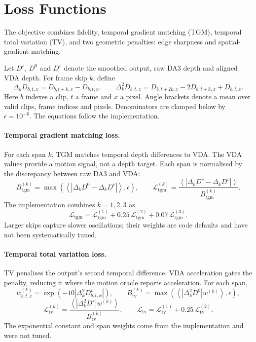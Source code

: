 \section{Loss Functions}
\label{sec:smoother-losses}

The objective combines fidelity, temporal gradient matching (TGM), temporal total variation (TV),
and two geometric penalties: edge sharpness and spatial-gradient matching. 

Let $D^s$, $D^0$ and $D^v$ denote the smoothed output, raw DA3 depth and aligned VDA depth. For
frame skip $k$, define
\[
    \Delta_k D_{b,t,x}=D_{b,t+k,x}-D_{b,t,x},\qquad
    \Delta_k^2D_{b,t,x}=D_{b,t+2k,x}-2D_{b,t+k,x}+D_{b,t,x}.
\]
Here $b$ indexes a clip, $t$ a frame and $x$ a pixel. Angle brackets denote a mean over valid
clips, frame indices and pixels. Denominators are clamped below by $\epsilon=10^{-6}$. The equations follow the implementation.

\paragraph{Temporal gradient matching loss.}
\label{sec:smoother-tgm}

For each span $k$, TGM matches temporal depth differences to VDA. The VDA values provide a motion
signal, not a depth target. Each span is normalised by the discrepancy between raw DA3 and VDA:
\[
    B_{\mathrm{tgm}}^{(k)}
      =\max\!\left(\left\langle\left|\Delta_kD^0-\Delta_kD^v\right|\right\rangle,\epsilon\right),
    \qquad
    \mathcal{L}_{\mathrm{tgm}}^{(k)}
      =\frac{\left\langle\left|\Delta_kD^s-\Delta_kD^v\right|\right\rangle}
                  {B_{\mathrm{tgm}}^{(k)}}.
\]
The implementation combines $k=1,2,3$ as
\[
    \mathcal{L}_{\mathrm{tgm}}
      =\mathcal{L}_{\mathrm{tgm}}^{(1)}
       +0.25\,\mathcal{L}_{\mathrm{tgm}}^{(2)}
       +0.07\,\mathcal{L}_{\mathrm{tgm}}^{(3)}.
\]
Larger skips capture slower oscillations; their weights are code defaults and have not been
systematically tuned.


\paragraph{Temporal total variation loss.}
\label{sec:smoother-tv}

TV penalises the output's second temporal difference. VDA acceleration gates the penalty, reducing
it where the motion oracle reports acceleration. For each span,
\[
    w_{b,t,x}^{(k)}
      =\exp\!\left(-10\left|\Delta_k^2D^v_{b,t,x}\right|\right),
    \qquad
    B_{\mathrm{tv}}^{(k)}
      =\max\!\left(\left\langle\left|\Delta_k^2D^0\right|w^{(k)}\right\rangle,\epsilon\right),
\]
\[
    \mathcal{L}_{\mathrm{tv}}^{(k)}
      =\frac{\left\langle\left|\Delta_k^2D^s\right|w^{(k)}\right\rangle}
                  {B_{\mathrm{tv}}^{(k)}},
    \qquad
    \mathcal{L}_{\mathrm{tv}}
      =\mathcal{L}_{\mathrm{tv}}^{(1)}+0.25\,\mathcal{L}_{\mathrm{tv}}^{(2)}.
\]
The exponential constant and span weights come from the implementation and were not tuned.


